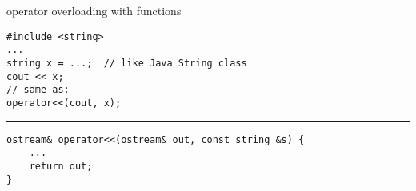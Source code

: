 \begin{frame}[fragile,label=opImplFunc]{operator overloading with functions}
\lstset{language=C++,style=smaller}
\begin{lstlisting}
#include <string>
...
string x = ...;  // like Java String class
cout << x;
// same as:
operator<<(cout, x);
\end{lstlisting}
\hrule
\begin{lstlisting}
ostream& operator<<(ostream& out, const string &s) {
    ...
    return out;
}
\end{lstlisting}
\end{frame}


